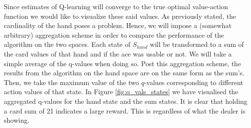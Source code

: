 Since estimates of Q-learning will converge to the true optimal value-action function we would like to visualize these said values. As previously stated, the cardinality of the hand poses a problem. Hence, we will impose a (somewhat arbitrary) aggregation scheme in order to compare the performance of the algorithm on the two spaces. Each state of $S_{hand}$ will be transformed to a sum of the card values of that hand and if the ace was usable or not. We will take a simple average of the q-values when doing so. Post this aggregation scheme, the results from the algorithm on the hand space are on the same form as the sum's. Then, we take the maximum value of the two $q$-values corresponding to different action values of that state. In Figure \ref{fig:q_vals_states} we have visualised the aggregated q-values for the hand state and the sum states. It is clear that holding a card sum of 21 indicates a large reward. This is regardless of what the dealer is showing.
